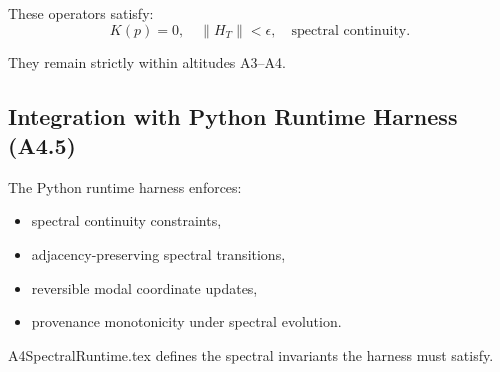 These operators satisfy:
\[
K(p) = 0, \quad \|H_T\| < \epsilon, \quad \text{spectral continuity}.
\]

They remain strictly within altitudes A3–A4.

\subsection{Integration with Python Runtime Harness (A4.5)}

The Python runtime harness enforces:
\begin{itemize}
  \item spectral continuity constraints,
  \item adjacency-preserving spectral transitions,
  \item reversible modal coordinate updates,
  \item provenance monotonicity under spectral evolution.
\end{itemize}

A4SpectralRuntime.tex defines the spectral invariants the harness must satisfy.

